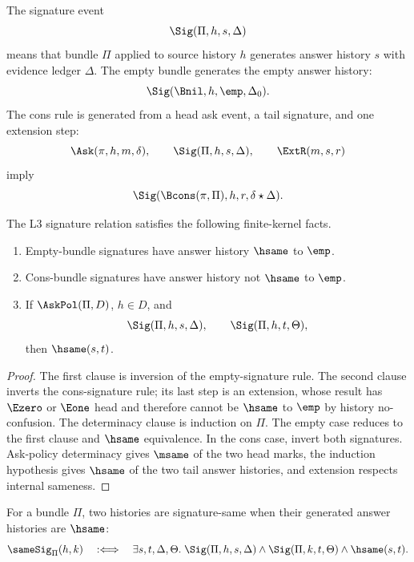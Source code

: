 \begin{definition}
\label{def:ask-sig-spine-signature-event}
The signature event
$$
\Sig(\Pi,h,s,\Delta)
$$
means that bundle $\Pi$ applied to source history $h$ generates answer
history $s$ with evidence ledger $\Delta$.  The empty bundle generates the
empty answer history:
$$
\Sig(\Bnil,h,\emp,\Delta_0).
$$
The cons rule is generated from a head ask event, a tail signature, and one
extension step:
$$
\Ask(\pi,h,m,\delta),
\qquad
\Sig(\Pi,h,s,\Delta),
\qquad
\ExtR(m,s,r)
$$
imply
$$
\Sig(\Bcons(\pi,\Pi),h,r,\delta\star\Delta).
$$
\end{definition}

\begin{theorem}
\label{thm:ask-sig-spine-signature-inversion-determinacy}
The L3 signature relation satisfies the following finite-kernel facts.
\begin{enumerate}
  \item Empty-bundle signatures have answer history $\hsame$ to $\emp$.
  \item Cons-bundle signatures have answer history not $\hsame$ to $\emp$.
  \item If $\AskPol(\Pi,D)$, $h\in D$, and
  $$
  \Sig(\Pi,h,s,\Delta),
  \qquad
  \Sig(\Pi,h,t,\Theta),
  $$
  then $\hsame(s,t)$.
\end{enumerate}
\end{theorem}

\begin{proof}
The first clause is inversion of the empty-signature rule.  The second
clause inverts the cons-signature rule; its last step is an extension, whose
result has $\Ezero$ or $\Eone$ head and therefore cannot be $\hsame$ to
$\emp$ by history no-confusion.  The determinacy clause is induction on
$\Pi$.  The empty case reduces to the first clause and $\hsame$ equivalence.
In the cons case, invert both signatures.  Ask-policy determinacy gives
$\msame$ of the two head marks, the induction hypothesis gives $\hsame$ of
the two tail answer histories, and extension respects internal sameness.
\end{proof}

\begin{definition}
\label{def:ask-sig-spine-signature-sameness}
For a bundle $\Pi$, two histories are signature-same when their generated
answer histories are $\hsame$:
$$
\sameSig_{\Pi}(h,k)
\quad:\Longleftrightarrow\quad
\exists s,t,\Delta,\Theta.\;
\Sig(\Pi,h,s,\Delta)
\wedge
\Sig(\Pi,k,t,\Theta)
\wedge
\hsame(s,t).
$$
\end{definition}

